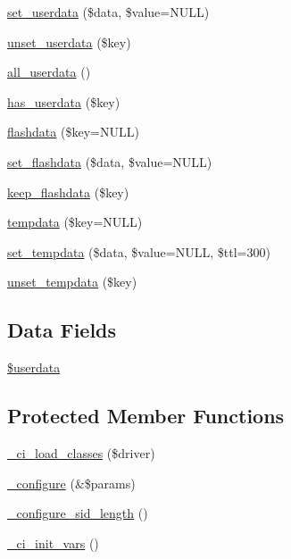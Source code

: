 \begin{DoxyCompactItemize}
\item 
\mbox{\hyperlink{class_c_i___session_a17de7d10cbbe8162d16bfc43083e74aa}{set\+\_\+userdata}} (\$data, \$value=N\+U\+LL)
\item 
\mbox{\hyperlink{class_c_i___session_a8d3a4935d2ff2088f11654445d9a0122}{unset\+\_\+userdata}} (\$key)
\item 
\mbox{\hyperlink{class_c_i___session_a974fa60ddc074b14ffcc78ef9902bc5c}{all\+\_\+userdata}} ()
\item 
\mbox{\hyperlink{class_c_i___session_a25f39652bb0f716817e5e1e778729bea}{has\+\_\+userdata}} (\$key)
\item 
\mbox{\hyperlink{class_c_i___session_acc27ddf9dd242d2c887eca2504136cff}{flashdata}} (\$key=N\+U\+LL)
\item 
\mbox{\hyperlink{class_c_i___session_a177029809f00f95b6a83cc137a45ff4e}{set\+\_\+flashdata}} (\$data, \$value=N\+U\+LL)
\item 
\mbox{\hyperlink{class_c_i___session_a1e25514ba8dbd132db06cbedc6412158}{keep\+\_\+flashdata}} (\$key)
\item 
\mbox{\hyperlink{class_c_i___session_a0bd79cb5948499f7c43adbe29f0c24a9}{tempdata}} (\$key=N\+U\+LL)
\item 
\mbox{\hyperlink{class_c_i___session_a51cac8d017a43882b365aa45745dc892}{set\+\_\+tempdata}} (\$data, \$value=N\+U\+LL, \$ttl=300)
\item 
\mbox{\hyperlink{class_c_i___session_a79d3115c19f6dfa873ca5f3a7929f24a}{unset\+\_\+tempdata}} (\$key)
\end{DoxyCompactItemize}
\subsection*{Data Fields}
\begin{DoxyCompactItemize}
\item 
\mbox{\hyperlink{class_c_i___session_af70e594e86a310311c717b13e6ecac00}{\$userdata}}
\end{DoxyCompactItemize}
\subsection*{Protected Member Functions}
\begin{DoxyCompactItemize}
\item 
\mbox{\hyperlink{class_c_i___session_ae4203f92a9f8a01d2498649f79acb0f9}{\+\_\+ci\+\_\+load\+\_\+classes}} (\$driver)
\item 
\mbox{\hyperlink{class_c_i___session_a71e7f49b0627505b4a7dbc8ce368279b}{\+\_\+configure}} (\&\$params)
\item 
\mbox{\hyperlink{class_c_i___session_af85033c81c047ceeec26aa087d5ba459}{\+\_\+configure\+\_\+sid\+\_\+length}} ()
\item 
\mbox{\hyperlink{class_c_i___session_a143bee24c36e5fd566b58bed89cd8463}{\+\_\+ci\+\_\+init\+\_\+vars}} ()
\end{DoxyCompactItemize}
